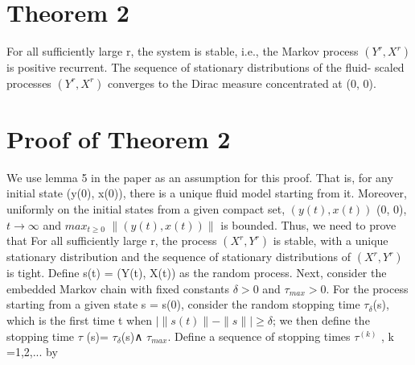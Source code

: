  \newpage
 \section*{Theorem 2}
 For all sufficiently large r, the system is stable, i.e., the Markov process $(Y^r, X^r)$ is positive recurrent. The sequence of stationary distributions of the fluid- scaled processes $(Y^r , X^ r) $ converges to the Dirac measure concentrated at (0, 0).
 
 \section*{Proof of Theorem 2}
 We use lemma 5 in the paper as an assumption for this proof. That is, for any initial state (y(0), x(0)), there is a unique fluid model starting from it. Moreover, uniformly on the initial states from a given compact set, \newline $(y(t), x(t))$ \rightarrow (0, 0), 
  $t \rightarrow \infty$  and $max_{t\geq 0}$ $\|(y(t),x(t))\|$ is bounded.
 \newline\newline Thus, we need to prove that For all sufficiently large r, the process $(X^r,Y^r)$ is stable, with a unique stationary distribution and the sequence of stationary distributions of $(X^r,Y^r)$ is tight.
 \newline\newline
 Define s(t) = (Y(t), X(t)) as the random process. Next,  consider the embedded Markov chain with fixed constants $\delta > 0$ and $\tau_ {max} > 0$. For the process starting from a given state s = s(0), consider the random stopping time $ \tau _\delta $(s), which is the first time t when $| \|s(t)\| - \|s\| | \geq \delta $; we then define the stopping time $\tau$ (s)= $\tau _{\delta}$(s)∧ $\tau_{max}$. Define a sequence of stopping times $\tau^{(k)}$ , k =1,2,... by 
	
